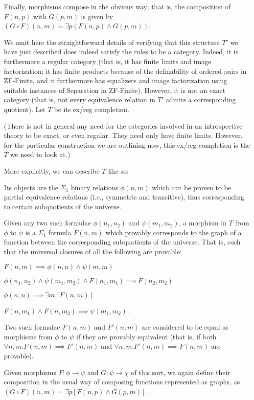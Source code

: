 \documentclass[./main.tex]{subfiles}
\begin{document}
Finally, morphisms compose in the obvious way; that is, the composition of $F(n, p)$ with $G(p, m)$ is given by $(G \circ F)(n, m) = \exists p (F(n, p) \wedge G(p, m))$.

We omit here the straightforward details of verifying that this structure $T'$ we have just described does indeed satisfy the rules to be a category. Indeed, it is furthermore a regular category (that is, it has finite limits and image factorization; it has finite products because of the definability of ordered pairs in ZF-Finite, and it furthermore has equalizers and image factorization using suitable instances of Separation in ZF-Finite). However, it is not an exact category (that is, not every equivalence relation in $T'$ admits a corresponding quotient). Let $T$ be its ex/reg completion.

(There is not in general any need for the categories involved in an introspective theory to be exact, or even regular. They need only have finite limits. However, for the particular construction we are outlining now, this ex/reg completion is the $T$ we need to look at.)

More explicitly, we can describe $T$ like so:

Its objects are the $\Sigma_1$ binary relations $\phi(n, m)$ which can be proven to be partial equivalence relations (i.e., symmetric and transitive), thus corresponding to certain subquotients of the universe.

Given any two such formulae $\phi(n_1, n_2)$ and $\psi(m_1, m_2)$, a morphism in $T$ from $\phi$ to $\psi$ is a $\Sigma_1$ formula $F(n, m)$ which provably corresponds to the graph of a function between the corresponding subquotients of the universe. That is, such that the universal closures of all the following are provable:

$F(n, m) \implies \phi(n, n) \wedge \psi(m, m)$

$\phi(n_1, n_2) \wedge \psi(m_1, m_2) \wedge F(n_1, m_1) \implies F(n_2, m_2)$

$\phi(n, n) \implies \exists m [F(n, m)]$

$F(n, m_1) \wedge F(n, m_2) \implies \psi(m_1, m_2)$.

Two such formulae $F(n, m)$ and $F'(n, m)$ are considered to be equal as morphisms from $\phi$ to $\psi$ if they are provably equivalent (that is, if both $\forall n, m . F(n, m) \implies F'(n, m)$ and $\forall n, m . F'(n, m) \implies F(n, m)$ are provable).

Given morphisms $F : \phi \to \psi$ and $G: \psi \to \chi$ of this sort, we again define their composition in the usual way of composing functions represented as graphs, as $(G \circ F)(n, m) = \exists p [F(n, p) \wedge G(p, m)]$.
\end{document}
